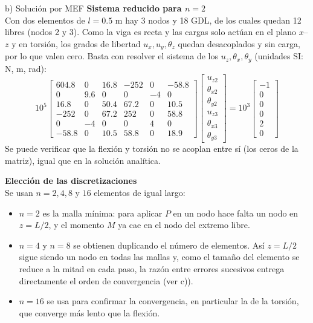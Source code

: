 \begin{desarrollo}{b) Solución por MEF}
\textbf{Sistema reducido para $n=2$}\\
Con dos elementos de $l=0.5$ m hay 3 nodos y 18 GDL, de los cuales quedan 12
libres (nodos 2 y 3). Como la viga es recta y las cargas solo actúan en el
plano $x$--$z$ y en torsión, los grados de libertad $u_x,u_y,\theta_z$ quedan desacoplados
y sin carga, por lo que valen cero. Basta con resolver el sistema de los
$u_z,\theta_x,\theta_y$ (unidades SI: N, m, rad):
\[
10^{5}
\begin{bmatrix}
604.8 & 0 & 16.8 & -252 & 0 & -58.8 \\
0 & 9.6 & 0 & 0 & -4 & 0 \\
16.8 & 0 & 50.4 & 67.2 & 0 & 10.5 \\
-252 & 0 & 67.2 & 252 & 0 & 58.8 \\
0 & -4 & 0 & 0 & 4 & 0 \\
-58.8 & 0 & 10.5 & 58.8 & 0 & 18.9
\end{bmatrix}
\begin{bmatrix}
u_{z2} \\ \theta_{x2} \\ \theta_{y2} \\ u_{z3} \\ \theta_{x3} \\ \theta_{y3}
\end{bmatrix}
=
10^{3}
\begin{bmatrix}
-1 \\ 0 \\ 0 \\ 0 \\ 2 \\ 0
\end{bmatrix}
\]
Se puede verificar que la flexión y torsión no se acoplan entre sí (los ceros
de la matriz), igual que en la solución analítica.

\textbf{Elección de las discretizaciones}\\
Se usan $n=2,4,8$ y $16$ elementos de igual largo:
\begin{itemize}[itemsep=2pt]
    \item $n=2$ es la malla mínima: para aplicar $P$ en un nodo hace falta un
    nodo en $z=L/2$, y el momento $M$ ya cae en el nodo del extremo libre.
    \item $n=4$ y $n=8$ se obtienen duplicando el número de elementos. Así
    $z=L/2$ sigue siendo un nodo en todas las mallas y, como el tamaño del
    elemento se reduce a la mitad en cada paso, la razón entre errores
    sucesivos entrega directamente el orden de convergencia (ver c)).
    \item $n=16$ se usa para confirmar la convergencia, en particular la de la
    torsión, que converge más lento que la flexión.
\end{itemize}


\end{desarrollo}
